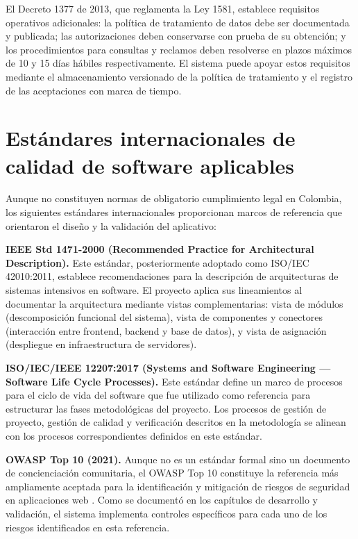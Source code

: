 El Decreto 1377 de 2013, que reglamenta la Ley 1581, establece requisitos operativos adicionales: la política de tratamiento de datos debe ser documentada y publicada; las autorizaciones deben conservarse con prueba de su obtención; y los procedimientos para consultas y reclamos deben resolverse en plazos máximos de 10 y 15 días hábiles respectivamente. El sistema puede apoyar estos requisitos mediante el almacenamiento versionado de la política de tratamiento y el registro de las aceptaciones con marca de tiempo.

\section{Estándares internacionales de calidad de software aplicables}
\label{sec:estandares-software}

Aunque no constituyen normas de obligatorio cumplimiento legal en Colombia, los siguientes estándares internacionales proporcionan marcos de referencia que orientaron el diseño y la validación del aplicativo:

\textbf{IEEE Std 1471-2000 (Recommended Practice for Architectural Description).} Este estándar, posteriormente adoptado como ISO/IEC 42010:2011, establece recomendaciones para la descripción de arquitecturas de sistemas intensivos en software. El proyecto aplica sus lineamientos al documentar la arquitectura mediante vistas complementarias: vista de módulos (descomposición funcional del sistema), vista de componentes y conectores (interacción entre frontend, backend y base de datos), y vista de asignación (despliegue en infraestructura de servidores).

\textbf{ISO/IEC/IEEE 12207:2017 (Systems and Software Engineering — Software Life Cycle Processes).} Este estándar define un marco de procesos para el ciclo de vida del software que fue utilizado como referencia para estructurar las fases metodológicas del proyecto. Los procesos de gestión de proyecto, gestión de calidad y verificación descritos en la metodología se alinean con los procesos correspondientes definidos en este estándar.

\textbf{OWASP Top 10 (2021).} Aunque no es un estándar formal sino un documento de concienciación comunitaria, el OWASP Top 10 constituye la referencia más ampliamente aceptada para la identificación y mitigación de riesgos de seguridad en aplicaciones web \cite{owasp_top10}. Como se documentó en los capítulos de desarrollo y validación, el sistema implementa controles específicos para cada uno de los riesgos identificados en esta referencia.

